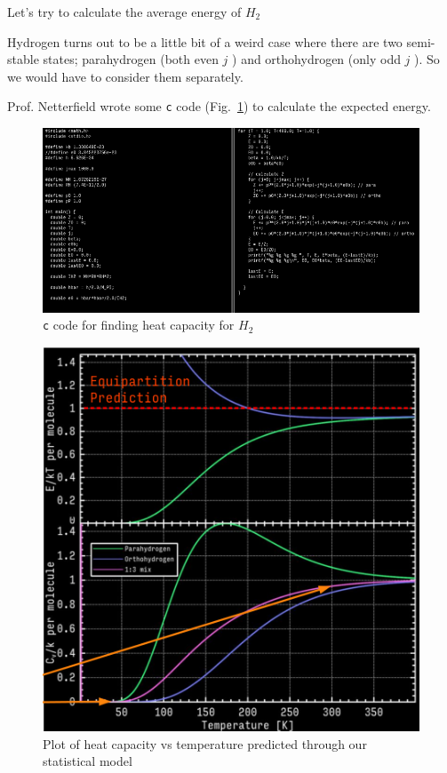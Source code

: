 \documentclass[10pt]{article}
\begin{document}
\begin{example}
	Let's try to calculate the average energy of $ H_2 $ 

	Hydrogen turns out to be a little bit of a weird case where there are two semi-stable states; parahydrogen (both even $ j $ ) and orthohydrogen (only odd $ j $ ). 
	So we would have to consider them separately.

	Prof. Netterfield wrote some \texttt{c} code (Fig.~\ref{fig:294:avg_energy_code}) to calculate the expected energy.

	\begin{figure}[H]
		\centering
		\includegraphics[width=0.8\linewidth]{img/294_c_code_l10.png}
		\caption{\texttt{c}  code for finding heat capacity for $ H_2 $ }
		\label{fig:294:avg_energy_code}
	\end{figure}
  
	\begin{figure}[H]
		\centering
		\includegraphics[width=0.8\linewidth]{img/294_l10_cv-slash-k.png}
		\caption{Plot of heat capacity vs temperature predicted through our statistical model}
	\end{figure}
\end{example}
\end{document}
